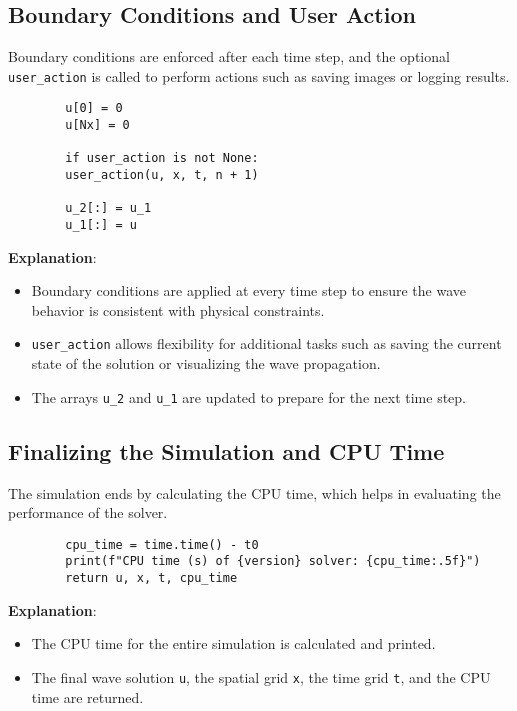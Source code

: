 \documentclass[a4paper, 11pt]{article}
\begin{document}
	\subsection{Boundary Conditions and User Action}
	
	Boundary conditions are enforced after each time step, and the optional \texttt{user\_action} is called to perform actions such as saving images or logging results.
	
	\lstset{language=Python}
	\begin{lstlisting}
		u[0] = 0
		u[Nx] = 0
		
		if user_action is not None:
		user_action(u, x, t, n + 1)
		
		u_2[:] = u_1
		u_1[:] = u
	\end{lstlisting}
	
	\textbf{Explanation}:
	\begin{itemize}
		\item Boundary conditions are applied at every time step to ensure the wave behavior is consistent with physical constraints.
		\item \texttt{user\_action} allows flexibility for additional tasks such as saving the current state of the solution or visualizing the wave propagation.
		\item The arrays \texttt{u\_2} and \texttt{u\_1} are updated to prepare for the next time step.
	\end{itemize}
	
	\subsection{Finalizing the Simulation and CPU Time}
	
	The simulation ends by calculating the CPU time, which helps in evaluating the performance of the solver.
	
	\lstset{language=Python}
	\begin{lstlisting}
		cpu_time = time.time() - t0
		print(f"CPU time (s) of {version} solver: {cpu_time:.5f}")
		return u, x, t, cpu_time
	\end{lstlisting}
	
	\textbf{Explanation}:
	\begin{itemize}
		\item The CPU time for the entire simulation is calculated and printed.
		\item The final wave solution \texttt{u}, the spatial grid \texttt{x}, the time grid \texttt{t}, and the CPU time are returned.
	\end{itemize}
	
\end{document}

